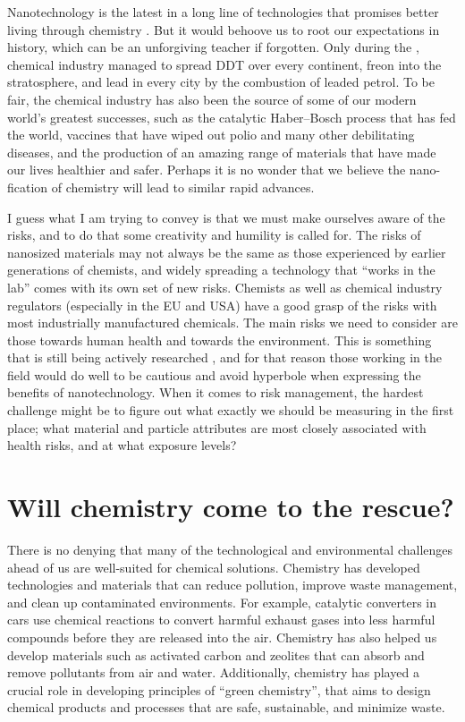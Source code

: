 \documentclass[webedition,openright,titles,swedish,english]{LuaUUThesis}\usepackage[]{graphicx}\usepackage[]{xcolor}
\begin{document}
Nanotechnology is the latest in a long line of technologies that promises
better living through chemistry \cite{Schummer2008}.
But it would behoove us to root our expectations in history, which can
be an unforgiving teacher if forgotten. Only during the , chemical
industry managed to spread DDT over every continent, freon into the stratosphere,
and lead in every city by the combustion of leaded petrol.
To be fair, the chemical industry has also been the source of some
of our modern world's greatest successes, such as the catalytic Haber--Bosch
process that has fed the world, vaccines that have wiped out polio and many other
debilitating diseases, and the production of an amazing range of materials that
have made our lives healthier and safer.
Perhaps it is no wonder that we believe the nano-fication of chemistry
will lead to similar rapid advances.

I guess what I am trying to convey is that we must make ourselves aware of the
risks, and to do that some creativity and humility is called for.
The risks of nanosized materials may not always be the same as those experienced
by earlier generations of chemists, and widely spreading a technology that
\enquote{works in the lab} comes with its own set of new risks.
Chemists as well as chemical industry regulators (especially in the
EU and USA) have a good grasp of the risks with most industrially manufactured
chemicals.
The main risks we need to consider are those towards human health and towards the environment.
This is something that is still being actively researched
\cite{Mitchell2019,Kim2016a,Reed2012,Maynard2011}, and for that reason those working
in the field would do well to be cautious and avoid hyperbole when expressing the
benefits of nanotechnology.
When it comes to risk management, the hardest challenge might be to figure out
what exactly we should be measuring in the first place; what material
and particle attributes are most closely associated with health risks, and at what
exposure levels? \cite{Maynard2015}





\section{Will chemistry come to the rescue?}
\label{intro:chemistry-rescue}

There is no denying that many of the technological and environmental challenges
ahead of us are well-suited for chemical solutions.
Chemistry has developed technologies and materials that can reduce pollution,
improve waste management, and clean up contaminated environments.
For example, catalytic converters in cars use chemical reactions to convert harmful
exhaust gases into less harmful compounds before they are released into the air.
Chemistry has also helped us develop materials such as activated carbon and zeolites that
can absorb and remove pollutants from air and water.
Additionally, chemistry has played a crucial role in developing principles of
\enquote{green chemistry}, that aims to design chemical products and processes
that are safe, sustainable, and minimize waste.
\end{document}
